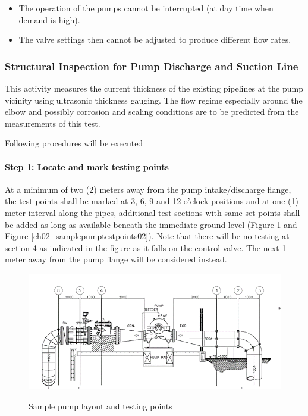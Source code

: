 \begin{itemize}
\item The operation of the pumps cannot be interrupted (at day time when demand is high).
\item The valve settings then cannot be adjusted to produce different flow rates.
\end{itemize}

\subsubsection{Structural Inspection for Pump Discharge and Suction Line}

This activity measures the current thickness of the existing pipelines at the pump vicinity using ultrasonic thickness gauging. The flow regime especially around the elbow and possibly corrosion and scaling conditions are to be predicted from the measurements of this test.

Following procedures will be executed

\paragraph{Step 1: Locate and mark testing points}
At a minimum of two (2) meters away from the pump intake/discharge flange, the test points shall be marked at 3, 6, 9 and 12 o’clock positions and at one (1) meter interval along the pipes, additional test sections with same set points shall be added as long as available beneath the immediate ground level (Figure \ref{ch02_samplepumptestpoints01} and Figure \ref{ch02_samplepumptestpoints02}). Note that there will be no testing at section 4 as indicated in the figure as it falls on the control valve. The next 1 meter away from the pump flange will be considered instead.

\begin{figure}[!htb]
	\includegraphics[scale=2]{figures/ch02_samplepumptestpoints01} \\
	\caption{Sample pump layout and testing points}
	\label{ch02_samplepumptestpoints01} 
\end{figure}

